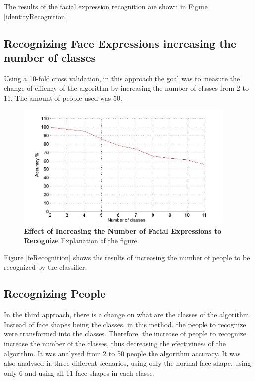\documentclass[]{article}
\begin{document}
The results of the facial expression recognition  are shown in Figure
\ref{identityRecognition}.
 
\subsection{Recognizing Face Expressions increasing the number of classes}

Using a 10-fold cross validation, in this approach the goal was to measure the
change of effiency of the algorithm by increasing the number of classes from 2
to 11. The amount of people used was 50.

\begin{figure}[ht]
\begin{center}
\vspace{-3mm}
\includegraphics[width=0.95\textwidth]{figures/50people_increasing_classes.jpg}
\end{center}
\caption{\textbf{Effect of Increasing the Number of Facial Expressions to Recognize} Explanation of the figure.}
\label{increasingNumberExpressions}
\end{figure}

Figure \ref{feRecognition} shows the results of increasing the number of people
to be recognized by the classifier.

\subsection{Recognizing People}

In the third approach, there is a change on what are the classes of the
algorithm. Instead of face shapes being the classes, in this method, the people
to recognize were transformed into the classes. Therefore, the increase of
people to recognize increase the number of the classes, thus decreasing the
efectiviness of the algorithm. It was analysed from 2 to 50 people the algorithm
accuracy. It was also analysed in three different scenarios, using only the
normal face shape, using only 6 and using all 11 face shapes in each classe.
 
\end{document}
